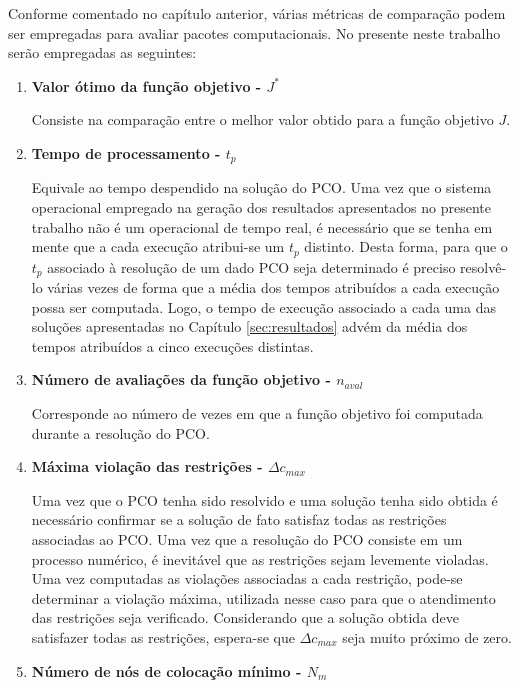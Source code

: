 
Conforme comentado no capítulo anterior, várias métricas de comparação podem ser empregadas para avaliar pacotes computacionais. No presente neste trabalho serão empregadas as seguintes:
%
\begin{enumerate}
	\item \textbf{Valor ótimo da função objetivo - \boldmath$J^* $}
	
	Consiste na comparação entre o melhor valor obtido para a função objetivo $ J $.
	
	\item \textbf{Tempo de processamento - \boldmath$ t_p $}
	
	Equivale ao tempo despendido na solução do PCO. Uma vez que o sistema operacional empregado na geração dos resultados apresentados no presente trabalho não é um operacional de tempo real, é necessário que se tenha em mente que a cada execução  atribui-se um $ t_p $ distinto. Desta forma,
	para que o $ t_p $ associado à resolução de um dado PCO seja determinado é preciso resolvê-lo várias vezes de forma que a média dos tempos atribuídos a cada execução possa ser computada. Logo, o tempo de execução associado a cada uma das soluções apresentadas no Capítulo \ref{sec:resultados} advém da média dos tempos atribuídos a cinco execuções distintas. 
	
	\item \textbf{Número de avaliações da função objetivo - \boldmath$ n_{ aval} $}
	
	Corresponde ao número de vezes em que a função objetivo foi computada durante a resolução do PCO.
	
	\item \textbf{Máxima violação das restrições - \boldmath$ \Delta c_{max} $ }
	
	Uma vez que o PCO tenha sido resolvido e uma solução tenha sido obtida é necessário confirmar se a solução de fato satisfaz todas as restrições associadas ao PCO. Uma vez que a resolução do PCO consiste em um processo numérico, é inevitável que as restrições sejam levemente violadas. Uma vez computadas as violações associadas a cada restrição, pode-se determinar a violação máxima, utilizada nesse caso para que o atendimento das restrições seja verificado. Considerando que a solução obtida deve satisfazer todas as restrições, espera-se que $ \Delta c_{max} $ seja muito próximo de zero. 
	
	\item \textbf{Número de nós de colocação mínimo - \boldmath$ N_m $}
	

\end{enumerate}
